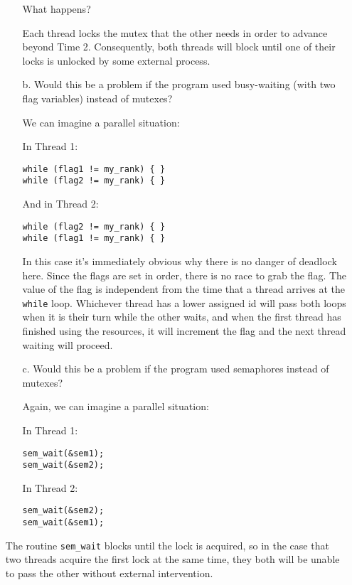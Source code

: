 \documentclass[11pt,epsfig,letterpaper]{article}
\begin{document}
\begin{enumerate}
\begin{enumerate}
            What happens?

            \quad Each thread locks the mutex that the other needs in order to advance beyond Time 2. Consequently, both threads will block until one of their locks is unlocked by some external process.

            \vspace{0.5pc}
                    \pagebreak
            \item[b.] Would this be a problem if the program used busy-waiting (with two flag variables) instead of mutexes?

            \quad We can imagine a parallel situation:
            \vspace{0.5pc}

                    In Thread 1:
\begin{verbatim}
while (flag1 != my_rank) { }
while (flag2 != my_rank) { }
\end{verbatim}
                    And in Thread 2:
\begin{verbatim}
while (flag2 != my_rank) { }
while (flag1 != my_rank) { }
\end{verbatim}

                    \quad In this case it's immediately obvious why there is no danger of deadlock here. Since the flags are set in order, there is no race to grab the flag. The value of the flag is independent from the time that a thread arrives at the {\tt while} loop. Whichever thread has a lower assigned id will pass both loops when it is their turn while the other waits, and when the first thread has finished using the resources, it will increment the flag and the next thread waiting will proceed.

            \vspace{0.5pc}
            \item[c.] Would this be a problem if the program used semaphores instead of mutexes?

            \quad Again, we can imagine a parallel situation:
            \vspace{0.5pc}

                    In Thread 1:
\begin{verbatim}
sem_wait(&sem1);
sem_wait(&sem2);
\end{verbatim}

                    In Thread 2:
\begin{verbatim}
sem_wait(&sem2);
sem_wait(&sem1);
\end{verbatim}
            \end{enumerate}
            \vspace{0.5pc}

            \quad The routine {\tt sem\_wait} blocks until the lock is acquired, so in the case that two threads acquire the first lock at the same time, they both will be unable to pass the other without external intervention.
            \pagebreak





    \end{enumerate}
\end{document}
